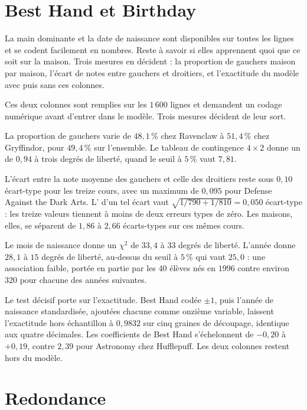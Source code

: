 \section{Best Hand et Birthday}
\label{sec:hand-birthday}

\begin{lecture}
La main dominante et la date de naissance sont disponibles sur toutes les lignes
et se codent facilement en nombres. Reste à savoir si elles apprennent quoi que
ce soit sur la maison. Trois mesures en décident : la proportion de gauchers
maison par maison, l'écart de notes entre gauchers et droitiers, et l'exactitude
du modèle avec puis sans ces colonnes.
\end{lecture}

Ces deux colonnes sont remplies sur les $1\,600$ lignes et demandent un codage
numérique avant d'entrer dans le modèle. Trois mesures décident de leur sort.

La proportion de gauchers varie de $48{,}1\,\%$ chez Ravenclaw à $51{,}4\,\%$
chez Gryffindor, pour $49{,}4\,\%$ sur l'ensemble. Le tableau de contingence
$4\times2$ donne un  de $0{,}94$ à trois degrés de liberté, quand le
seuil à $5\,\%$ vaut $7{,}81$.

L'écart entre la note moyenne des gauchers et celle des droitiers reste sous
$0{,}10$ écart-type pour les treize cours, avec un maximum de $0{,}095$ pour
Defense Against the Dark Arts. L' d'un tel écart vaut
$\sqrt{1/790+1/810}=0{,}050$ écart-type : les treize valeurs tiennent à moins de
deux erreurs types de zéro. Les maisons, elles, se séparent de $1{,}86$ à
$2{,}66$ écarts-types sur ces mêmes cours.

Le mois de naissance donne un $\chi^2$ de $33{,}4$ à $33$ degrés de liberté.
L'année donne $28{,}1$ à $15$ degrés de liberté, au-dessus du seuil à $5\,\%$ qui
vaut $25{,}0$ : une association faible, portée en partie par les $40$ élèves nés
en $1996$ contre environ $320$ pour chacune des années suivantes.

Le test décisif porte sur l'exactitude. Best Hand codée $\pm1$, puis l'année de
naissance standardisée, ajoutées chacune comme onzième variable, laissent
l'exactitude hors échantillon à $0{,}9832$ sur cinq graines de découpage,
identique aux quatre décimales. Les coefficients de Best Hand s'échelonnent de
$-0{,}20$ à $+0{,}19$, contre $2{,}39$ pour Astronomy chez Hufflepuff. Les deux
colonnes restent hors du modèle.

\section{Redondance}
\label{sec:redondance}

